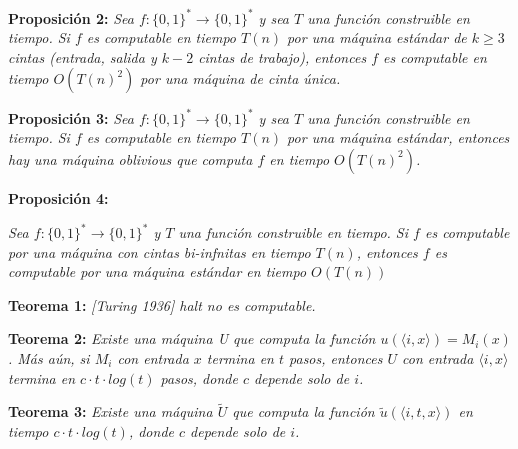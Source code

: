 \documentclass{article}
\begin{document}
\begin{flushleft}
  \textbf{\hypertarget{prop2}{Proposición 2:}} 
  \textit{Sea $f : \{0,1\}^* \rightarrow \{0,1\}^*$ y sea $T$ una función construible en tiempo. 
  Si $f$ es computable en tiempo $T(n)$ por una máquina estándar de $k \geq 3$ cintas (entrada, 
  salida y $k - 2$ cintas de trabajo), entonces $f$ es computable en tiempo $O(T(n)^2)$ por una 
  máquina de cinta única.}\\[0.5em]
\end{flushleft}

\begin{flushleft}
  \textbf{Proposición 3:}
  \textit{Sea $f : \{0,1\}^* \rightarrow \{0,1\}^*$ y sea $T$ una función construible en tiempo. Si $f$
  es computable en tiempo $T(n)$ por una máquina estándar, entonces hay una máquina oblivious que 
  computa $f$ en tiempo $O(T(n)^2)$.}\\[0.5em]
\end{flushleft}

\begin{flushleft}
  \textbf{Proposición 4:}

  \textit{Sea $f : \{0,1\}^* \rightarrow \{0,1\}^*$ y $T$ una función construible en tiempo. Si $f$
  es computable por una máquina con cintas bi-infnitas en tiempo $T(n)$, entonces $f$ es computable
  por una máquina estándar en tiempo $O(T(n))$}\\[0.5em]
\end{flushleft}

\begin{flushleft}
  \textbf{Teorema 1:}
  \textit{[Turing 1936] halt no es computable.}\\[0.5em]
\end{flushleft}

\begin{flushleft}
  \textbf{\hypertarget{teo2}{Teorema 2:}}
  \textit{Existe una máquina U que computa la función $u(\langle i,x \rangle) = M_i(x)$. Más aún, 
  si $M_i$ con entrada $x$ termina en $t$ pasos, entonces $U$ con entrada $\langle i,x \rangle$ termina
  en $c \cdot t \cdot  log(t)$ pasos, donde $c$ depende solo de $i$.}
\end{flushleft}

\begin{flushleft}
  \textbf{Teorema 3:}
  \textit{Existe una máquina $\widetilde{U}$ que computa la función $\widetilde{u}(\langle i,t,x \rangle)$
  en tiempo $c \cdot t \cdot log(t)$, donde $c$ depende solo de $i$.} 
\end{flushleft}
\end{document}
